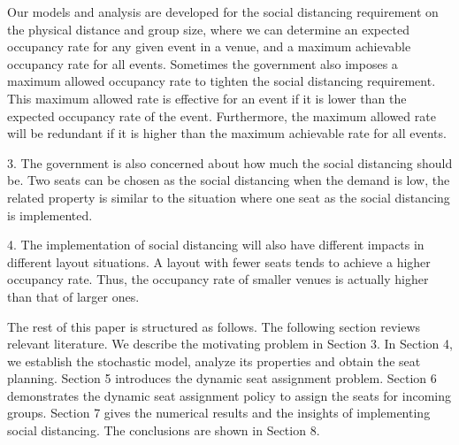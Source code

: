 
Our models and analysis are developed for the social distancing requirement on the physical distance and group size, where we can determine an expected occupancy rate for any given event in a venue, and a maximum achievable occupancy rate for all events. Sometimes the government also imposes a maximum allowed occupancy rate to tighten the social distancing requirement. This maximum allowed rate is effective for an event if it is lower than the expected occupancy rate of the event. Furthermore, the maximum allowed rate will be redundant if it is higher than the maximum achievable rate for all events.

3. The government is also concerned about how much the social distancing should be. Two seats can be chosen as the social distancing when the demand is low, the related property is similar to the situation where one seat as the social distancing is implemented.

4. The implementation of social distancing will also have different impacts in different layout situations. A layout with fewer seats tends to achieve a higher occupancy rate. Thus, the occupancy rate of smaller venues is actually higher than that of larger ones.

The rest of this paper is structured as follows. The following section reviews relevant literature. We describe the motivating problem in Section 3. In Section 4, we establish the stochastic model, analyze its properties and obtain the seat planning. Section 5 introduces the dynamic seat assignment problem.
Section 6 demonstrates the dynamic seat assignment policy to assign the seats for incoming groups. Section 7 gives the numerical results and the insights of implementing social distancing. The conclusions are shown in Section 8.
\newpage







